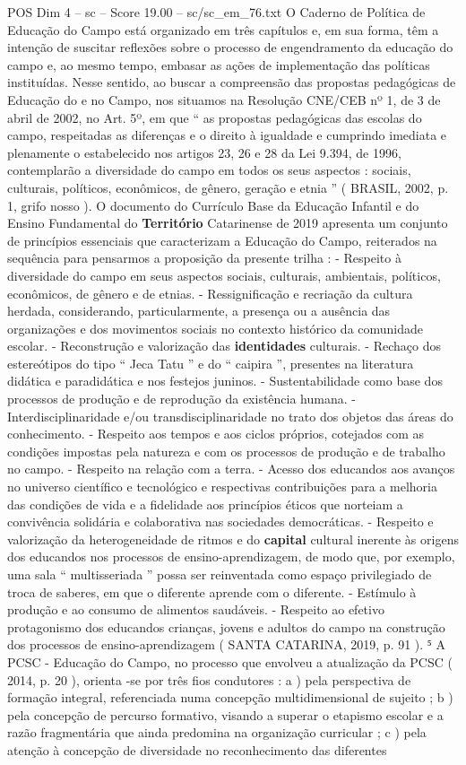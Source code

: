 \begin{textsample}{POS Dim 4 – sc – Score 19.00 – sc/sc\_em\_76.txt}
O Caderno de Política de Educação do Campo está organizado em três capítulos e, em sua forma, têm a intenção de suscitar reflexões sobre o processo de engendramento da educação do campo e, ao mesmo tempo, embasar as ações de implementação das políticas instituídas.
Nesse sentido, ao buscar a compreensão das propostas pedagógicas de Educação do e no Campo, nos situamos na Resolução CNE/CEB nº 1, de 3 de abril de 2002, no Art. 5º, em que “ as propostas pedagógicas das escolas do campo, respeitadas as diferenças e o direito à igualdade e cumprindo imediata e plenamente o estabelecido nos artigos 23, 26 e 28 da Lei 9.394, de 1996, contemplarão a diversidade do campo em todos os seus aspectos : sociais, culturais, políticos, econômicos, de gênero, geração e etnia ” ( BRASIL, 2002, p. 1, grifo nosso ).
O documento do Currículo Base da Educação Infantil e do Ensino Fundamental do \textbf{Território} Catarinense de 2019 apresenta um conjunto de princípios essenciais que caracterizam a Educação do Campo, reiterados na sequência para pensarmos a proposição da presente trilha : - Respeito à diversidade do campo em seus aspectos sociais, culturais, ambientais, políticos, econômicos, de gênero e de etnias. - Ressignificação e recriação da cultura herdada, considerando, particularmente, a presença ou a ausência das organizações e dos movimentos sociais no contexto histórico da comunidade escolar. - Reconstrução e valorização das \textbf{identidades} culturais. - Rechaço dos estereótipos do tipo “ Jeca Tatu ” e do “ caipira ”, presentes na literatura didática e paradidática e nos festejos juninos. - Sustentabilidade como base dos processos de produção e de reprodução da existência humana. - Interdisciplinaridade e/ou transdisciplinaridade no trato dos objetos das áreas do conhecimento. - Respeito aos tempos e aos ciclos próprios, cotejados com as condições impostas pela natureza e com os processos de produção e de trabalho no campo. - Respeito na relação com a terra. - Acesso dos educandos aos avanços no universo científico e tecnológico e respectivas contribuições para a melhoria das condições de vida e a fidelidade aos princípios éticos que norteiam a convivência solidária e colaborativa nas sociedades democráticas. - Respeito e valorização da heterogeneidade de ritmos e do \textbf{capital} cultural inerente às origens dos educandos nos processos de ensino-aprendizagem, de modo que, por exemplo, uma sala “ multisseriada ” possa ser reinventada como espaço privilegiado de troca de saberes, em que o diferente aprende com o diferente. - Estímulo à produção e ao consumo de alimentos saudáveis. - Respeito ao efetivo protagonismo dos educandos crianças, jovens e adultos do campo na construção dos processos de ensino-aprendizagem ( SANTA CATARINA, 2019, p. 91 ). ⁵ A PCSC - Educação do Campo, no processo que envolveu a atualização da PCSC ( 2014, p. 20 ), orienta -se por três fios condutores : a ) pela perspectiva de formação integral, referenciada numa concepção multidimensional de sujeito ; b ) pela concepção de percurso formativo, visando a superar o etapismo escolar e a razão fragmentária que ainda predomina na organização curricular ; c ) pela atenção à concepção de diversidade no reconhecimento das diferentes 
\end{textsample}
